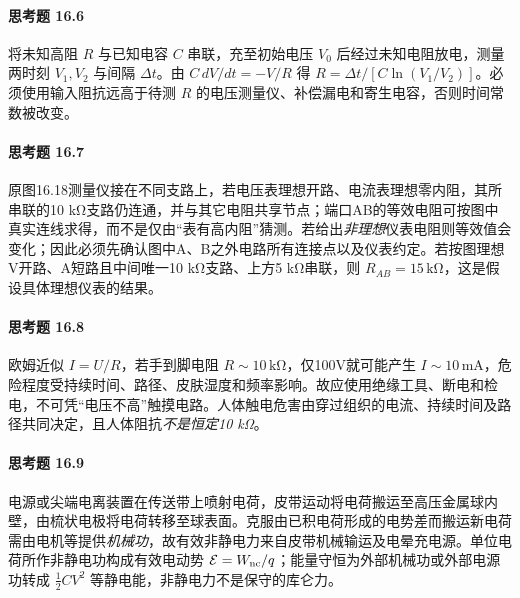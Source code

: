 \paragraph{思考题 16.6}
将未知高阻 \(R\) 与已知电容 \(C\) 串联，充至初始电压 \(V_0\) 后经过未知电阻放电，测量两时刻 \(V_1,V_2\) 与间隔 \(\Delta t\)。由 \(C\,dV/dt=-V/R\) 得 \(\boxed{R=\Delta t/[C\ln(V_1/V_2)]}\)。必须使用输入阻抗远高于待测 \(R\) 的电压测量仪、补偿漏电和寄生电容，否则时间常数被改变。

\paragraph{思考题 16.7}
原图16.18测量仪接在不同支路上，若电压表理想开路、电流表理想零内阻，其所串联的10 kΩ支路仍连通，并与其它电阻共享节点；端口AB的等效电阻可按图中真实连线求得，而不是仅由“表有高内阻”猜测。若给出\emph{非理想}仪表电阻则等效值会变化；因此必须先确认图中A、B之外电路所有连接点以及仪表约定。若按图理想V开路、A短路且中间唯一10 kΩ支路、上方5 kΩ串联，则 \(\boxed{R_{AB}=15\,\mathrm{k\Omega}}\)，这是假设具体理想仪表的结果。

\paragraph{思考题 16.8}
欧姆近似 \(I=U/R\)，若手到脚电阻 \(R\sim10\,\mathrm{k\Omega}\)，仅100V就可能产生 \(I\sim10\,\mathrm{mA}\)，危险程度受持续时间、路径、皮肤湿度和频率影响。故应使用绝缘工具、断电和检电，不可凭“电压不高”触摸电路。人体触电危害由穿过组织的电流、持续时间及路径共同决定，且人体阻抗\emph{不是恒定10 kΩ}。

\paragraph{思考题 16.9}
电源或尖端电离装置在传送带上喷射电荷，皮带运动将电荷搬运至高压金属球内壁，由梳状电极将电荷转移至球表面。克服由已积电荷形成的电势差而搬运新电荷需由电机等提供\emph{机械功}，故有效非静电力来自皮带机械输运及电晕充电源。单位电荷所作非静电功构成有效电动势 \(\mathcal E=W_{\rm nc}/q\)；能量守恒为外部机械功或外部电源功转成 \(\tfrac12 CV^2\) 等静电能，非静电力不是保守的库仑力。
